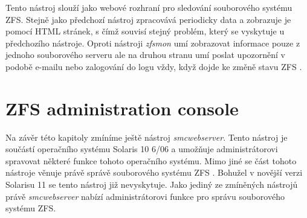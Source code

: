 Tento nástroj slouží jako webové rozhraní pro sledování souborového systému ZFS. Stejně jako předchozí nástroj zpracovává periodicky data a zobrazuje je pomocí HTML stránek, s čímž souvisí stejný problém, který se vyskytuje u předchozího nástroje. Oproti nástroji \emph{zfsmon} umí zobrazovat informace pouze z jednoho souborového serveru ale na druhou stranu umí poslat upozornění v podobě e-mailu nebo zalogování do logu vždy, když dojde ke změně stavu ZFS \cite{zfswatcher}.
\section{ZFS administration console}
Na závěr této kapitoly zmíníme ještě nástroj \emph{smcwebserver}. Tento nástroj je součástí operačního systému Solaris 10 6/06 a umožňuje administrátorovi spravovat některé funkce tohoto operačního systému. Mimo jiné se část tohoto nástroje věnuje právě správě souborového systému ZFS \cite{smc}. Bohužel v novější verzi Solarisu 11 se tento nástroj již nevyskytuje. Jako jediný ze zmíněných nástrojů právě \emph{smcwebserver} nabízí administrátorovi funkce pro správu souborového systému ZFS. 